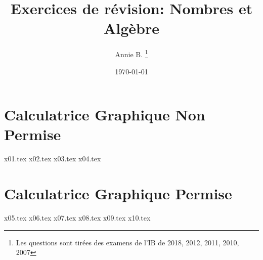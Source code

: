 \documentclass[10pt]{article}
\newcounter{question}
\begin{document}
 
\title{Exercices de révision: Nombres et Algèbre}
\author{Annie B. \thanks{Les questions sont tirées des examens de l’IB de 2018, 2012, 2011, 2010, 2007}}
\date{\today}
\maketitle

\newpage
\section*{\textbf{Calculatrice Graphique Non Permise}}
{x01.tex}
\bigskip
{x02.tex}
\bigskip
{x03.tex}
\bigskip
{x04.tex}
\bigskip
\section*{\textbf{Calculatrice Graphique Permise}}
{x05.tex}
\bigskip
{x06.tex}
\newpage
{x07.tex}
\bigskip
{x08.tex}
\bigskip
{x09.tex}
\bigskip
{x10.tex}
\end{document}

